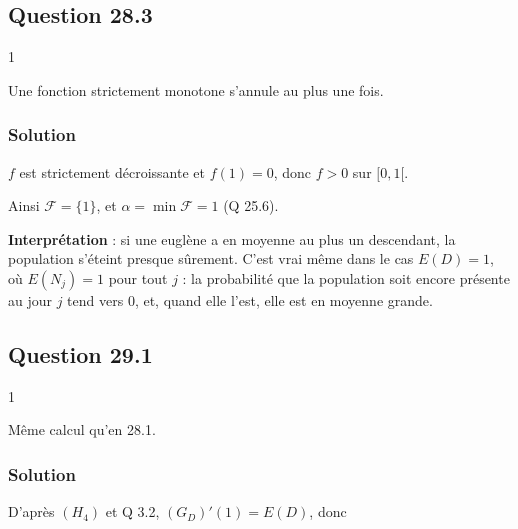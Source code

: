 \documentclass[11pt,a4paper]{article}
\newcommand{\equationajustee}[1]{%
  \sbox{\boiteequation}{$\displaystyle #1$}%
  \ifdim\wd\boiteequation>\linewidth
    \[\resizebox{\linewidth}{!}{\usebox{\boiteequation}}\]%
  \else
    \[#1\]%
  \fi}
\begin{document}
\hypertarget{question-28.3}{%
\subsection{Question 28.3}\label{question-28.3}}

\begin{indication}{1}

Une fonction strictement monotone s'annule au plus une fois.

\end{indication}

\hypertarget{solution-67}{%
\subsubsection{Solution}\label{solution-67}}

\(f\) est strictement décroissante et \(f(1)=0\), donc \(f>0\) sur \([0,1[\).

Ainsi \(\mathcal F=\{1\}\), et \(\alpha=\min\mathcal F=1\) (Q 25.6).

\equationajustee{\boxed{\mathcal F=\{1\}}}

\equationajustee{\boxed{\alpha=1}}

\textbf{Interprétation} : si une euglène a en moyenne au plus un descendant, la population s'éteint presque sûrement. C'est vrai même dans le cas \(E(D)=1\), où \(E(N_j)=1\) pour tout \(j\) : la probabilité que la population soit encore présente au jour \(j\) tend vers \(0\), et, quand elle l'est, elle est en moyenne grande.

\hypertarget{question-29.1}{%
\subsection{Question 29.1}\label{question-29.1}}

\begin{indication}{1}

Même calcul qu'en 28.1.

\end{indication}

\hypertarget{solution-68}{%
\subsubsection{Solution}\label{solution-68}}

D'après \((H_4)\) et Q 3.2, \((G_D)'(1)=E(D)\), donc

\equationajustee{\boxed{f'(1)=E(D)-1>0}}
\end{document}
